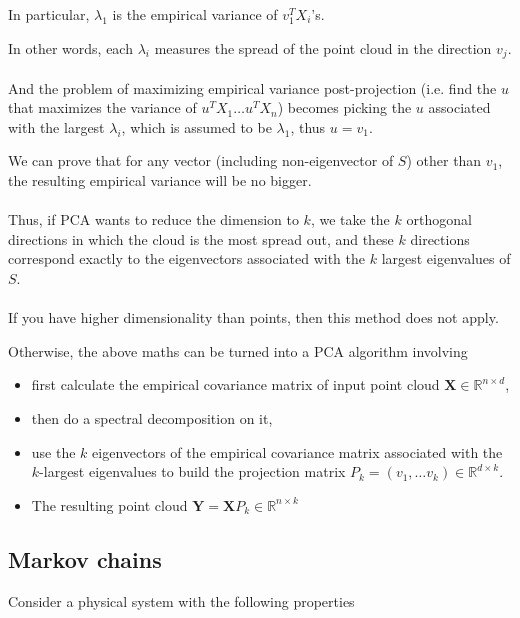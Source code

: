 \documentclass{article}
\begin{document}
In particular, $\lambda_1$ is the empirical variance of $v_1^T X_i$'s.

In other words, each $\lambda_i$ measures the spread of the point cloud in the direction $v_j$.
\\
\\
And the problem of maximizing empirical variance post-projection (i.e. find the $u$ that maximizes the variance of $u^T X_1 \dots u^T X_n$) becomes
picking the $u$ associated with the largest $\lambda_i$,
which is assumed to be $\lambda_1$,
thus $u = v_1$.

We can prove that for any vector (including non-eigenvector of $S$) other than $v_1$,
the resulting empirical variance will be no bigger.
\\
\\
Thus, if PCA wants to reduce the dimension to $k$,
we take the $k$ orthogonal directions in which the cloud is the most spread out,
and these $k$ directions correspond exactly to the eigenvectors associated with the $k$ largest eigenvalues of $S$.
\\
\\
If you have higher dimensionality than points, then this method does not apply.

Otherwise, the above maths can be turned into a PCA algorithm involving
\begin{itemize}
  \item first calculate the empirical covariance matrix of input point cloud $\mathbf{X} \in \mathbb{R}^{n \times d}$,
  \item then do a spectral decomposition on it,
  \item use the $k$ eigenvectors of the empirical covariance matrix
  associated with the $k$-largest eigenvalues to build the projection matrix
  $P_k = (v_1, \dots v_k) \in \mathbb{R}^{d \times k}$.
  \item The resulting point cloud $\mathbf{Y} = \mathbf{X} P_k \in \mathbb{R}^{n \times k}$
\end{itemize}


\subsection{Markov chains}

Consider a physical system with the following properties
\end{document}
